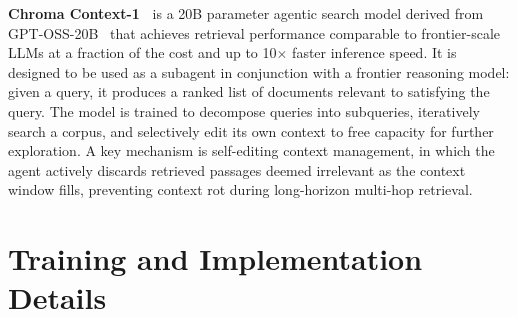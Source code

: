 \documentclass{llmxive}
\begin{document}
\noindent
\textbf{Chroma Context-1~\cite{bashir2026context1}} is a 20B parameter agentic search model derived from \textsc{GPT-OSS-20B}~\cite{openai2025gptoss120bgptoss20bmodel} that achieves retrieval performance comparable to frontier-scale LLMs at a fraction of the cost and up to 10$\times$ faster inference speed. It is designed to be used as a subagent in conjunction with a frontier reasoning model: given a query, it produces a ranked list of documents relevant to satisfying the query. The model is trained to decompose queries into subqueries, iteratively search a corpus, and selectively edit its own context to free capacity for further exploration.  A key mechanism is self-editing context management, in which the agent actively discards retrieved passages deemed irrelevant as the context window fills, preventing context rot during long-horizon multi-hop retrieval.
\section{Training and Implementation Details}
\label{app:training_and_implementation}
\end{document}
